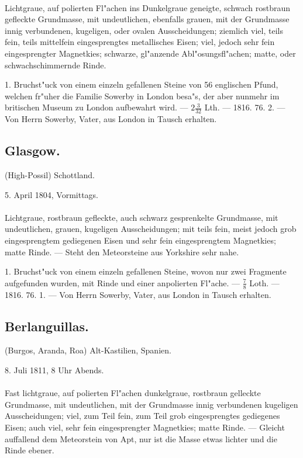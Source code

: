 \documentclass[a4paper, 11pt, oneside, polutonikogreek, german]{article}
\begin{document}
\paragraph{}
Lichtgraue, auf polierten Fl"achen ins Dunkelgraue geneigte, schwach rostbraun gefleckte Grundmasse, mit undeutlichen, ebenfalls grauen, mit der Grundmasse innig verbundenen, kugeligen, oder ovalen Ausscheidungen; ziemlich viel, teils fein, teils mittelfein eingesprengtes metallisches Eisen; viel, jedoch sehr fein eingesprengter Magnetkies; schwarze, gl"anzende Abl"osungsfl"achen; matte, oder schwachschimmernde Rinde.

1. Bruchst"uck von einem einzeln gefallenen Steine von 56 englischen Pfund, welchen fr"uher die Familie Sowerby in London besa"s, der aber nunmehr im britischen Museum zu London aufbewahrt wird. --- $2\frac{3}{32}$ Lth. --- 1816. 76. 2. --- Von Herrn Sowerby, Vater, aus London in Tausch erhalten.
\subsection{Glasgow.}
\begin{center}
\small
(High-Possil) Schottland.

5. April 1804, Vormittags.
\end{center}
\paragraph{}
Lichtgraue, rostbraun gefleckte, auch schwarz gesprenkelte Grundmasse, mit undeutlichen, grauen, kugeligen Ausscheidungen; mit teils fein, meist jedoch grob eingesprengtem gediegenen Eisen und sehr fein eingesprengtem Magnetkies; matte Rinde. --- Steht den Meteorsteine aus Yorkshire sehr nahe.

1. Bruchst"uck von einem einzeln gefallenen Steine, wovon nur zwei Fragmente aufgefunden wurden, mit Rinde und einer anpolierten Fl"ache. --- $\frac{7}{8}$ Loth. --- 1816. 76. 1. --- Von Herrn Sowerby, Vater, aus London in Tausch erhalten.
\subsection{Berlanguillas.}
\begin{center}
\small
(Burgos, Aranda, Roa) Alt-Kastilien, Spanien.

8. Juli 1811, 8 Uhr Abends.
\end{center}
\paragraph{}
Fast lichtgraue, auf polierten Fl"achen dunkelgraue, rostbraun gelleckte Grundmasse, mit undeutlichen, mit der Grundmasse innig verbundenen kugeligen Ausscheidungen; viel, zum Teil fein, zum Teil grob eingesprengtes gediegenes Eisen; auch viel, sehr fein eingesprengter Magnetkies; matte Rinde. --- Gleicht auffallend dem Meteorstein von Apt, nur ist die Masse etwas lichter und die Rinde ebener.
\end{document}
